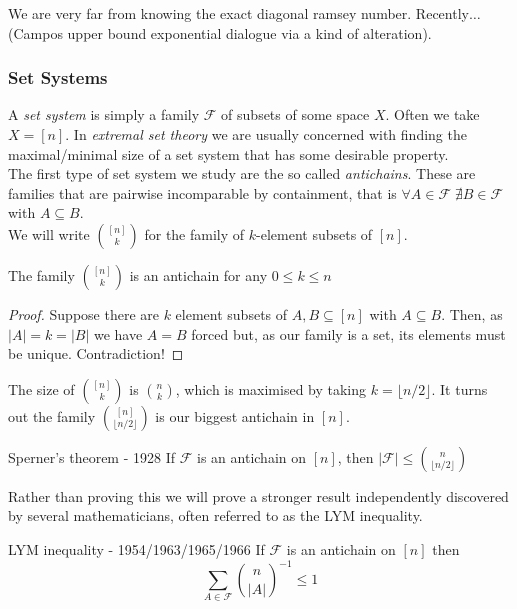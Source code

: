 \documentclass{article}
\begin{document}
We are very far from knowing the exact diagonal ramsey number. Recently$\dots$ (Campos upper bound exponential 
dialogue via a kind of alteration). 

\subsubsection{Set Systems}

A {\it set system} is simply a family $\mathcal{F}$ of subsets of some space $X$. Often we take $X = [n]$. In 
{\it extremal set theory} we are usually concerned with finding the maximal/minimal size of a set system that 
has some desirable property. \\ 

The first type of set system we study are the so called {\it antichains}. These are families that are pairwise 
incomparable by containment, that is $\forall A \in \mathcal{F} \; \nexists B \in \mathcal{F}$ with $ A \subseteq B$. \\

We will write $\binom{[n]}{k}$ for the family of $k$-element subsets of $[n]$. 

\begin{claim}
    The family $\binom{[n]}{k}$ is an antichain for any $0 \leq k \leq n$
\end{claim}

\begin{proof}
    Suppose there are $k$ element subsets of $A, B \subseteq [n]$ with $A \subseteq B$. Then, as $|A| = k = |B|$ 
    we have $A = B$ forced but, as our family is a set, its elements must be unique. Contradiction!
\end{proof}

The size of $\binom{[n]}{k}$ is $\binom{n}{k}$, which is maximised by taking $k = \lfloor n/2 \rfloor$. It turns 
out the family $\binom{[n]}{\lfloor n/2 \rfloor}$ is our biggest antichain in $[n]$. 

\begin{theorem}[]{Sperner's theorem - 1928}
    If $\mathcal{F}$ is an antichain on $[n]$, then $|\mathcal{F}| \leq \binom{n}{\lfloor n/2 \rfloor}$
\end{theorem}

Rather than proving this we will prove a stronger result independently discovered by several mathematicians, 
often referred to as the LYM inequality. 

\begin{theorem}[]{LYM inequality - 1954/1963/1965/1966}
    If $\mathcal{F}$ is an antichain on $[n]$ then 
    \[\sum_{A \in \mathcal{F}}\binom{n}{|A|}^{-1} \leq 1\]
\end{theorem}
\end{document}
